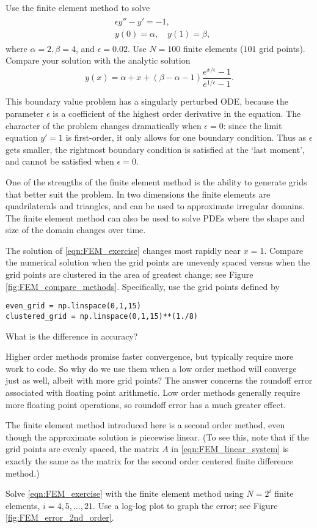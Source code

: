
Use the finite element method to solve
\begin{align}
	\begin{split}
	&{ }\epsilon y'' - y' = -1,\\
	&{ }y(0) = \alpha, \quad y(1) = \beta,
	\end{split} \label{eqn:FEM_exercise}
\end{align}
where $\alpha = 2, \beta = 4$, and $\epsilon = 0.02$.
Use $N = 100$ finite elements ($101$ grid points).
Compare your solution with the analytic solution
\[y(x) = \alpha + x + (\beta - \alpha - 1 ) \frac{e^{x/\epsilon} -1}{e^{1/\epsilon} -1}.\]

This boundary value problem has a singularly perturbed ODE, because the parameter $\epsilon$ is a coefficient of the highest order derivative in the equation.
The character of the problem changes dramatically when $\epsilon = 0$: since the limit equation $y' = 1$ is first-order, it only allows for one boundary condition.
Thus as $\epsilon$ gets smaller, the rightmost boundary condition is satisfied at the `last moment',  and cannot be satisfied when $\epsilon = 0$.

One of the strengths of the finite element method is the ability to generate grids that better suit the problem.
In two dimensions the finite elements are quadrilaterals and triangles, and can be used to approximate irregular domains.
The finite element method can also be used to solve PDEs where the shape and size of the domain changes over time.

The solution of \eqref{eqn:FEM_exercise} changes most rapidly near $x = 1$.
Compare the numerical solution when the grid points are unevenly spaced versus when the grid points are clustered in the area of greatest change; see Figure \ref{fig:FEM_compare_methods}. Specifically, use the grid points defined by
\begin{lstlisting}
even_grid = np.linspace(0,1,15)
clustered_grid = np.linspace(0,1,15)**(1./8)
\end{lstlisting}
What is the difference in accuracy?

\label{prob:FEM_accuracy_comparison}
Higher order methods promise faster convergence, but typically require more work to code.
So why do we use them when a low order method will converge just as well, albeit with more grid points?
The answer concerns the roundoff error associated with floating point arithmetic.
Low order methods generally require more floating point operations, so roundoff error has a much greater effect.

The finite element method introduced here is a second order method, even though the approximate solution is piecewise linear.
(To see this, note that if the grid points are evenly spaced, the matrix $A$ in \eqref{eqn:FEM_linear_system} is exactly the same as the matrix for the second order centered finite difference method.)

Solve \eqref{eqn:FEM_exercise} with the finite element method using $N = 2^i$  finite elements, $i = 4, 5, \ldots, 21$.
Use a log-log plot to graph the error; see Figure \ref{fig:FEM_error_2nd_order}.
